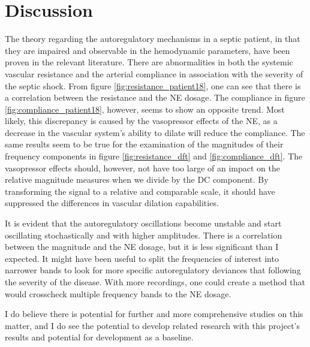 
\chapter{Discussion}

The theory regarding the autoregulatory mechanisms in a septic patient, in that they are impaired and observable in the hemodynamic parameters, have been proven in the relevant literature. There are abnormalities in both the systemic vascular resistance and the arterial compliance in association with the severity of the septic shock. From figure \ref{fig:resistance_patient18}, one can see that there is a correlation between the resistance and the NE dosage. The compliance in figure \ref{fig:compliance_patient18}, however, seems to show an opposite trend. Most likely, this discrepancy is caused by the vasopressor effects of the NE, as a decrease in the vascular system's ability to dilate will reduce the compliance. The same results seem to be true for the examination of the magnitudes of their frequency components in figure \ref{fig:resistance_dft} and \ref{fig:compliance_dft}. The vasopressor effects should, however, not have too large of an impact on the relative magnitude measures when we divide by the DC component. By transforming the signal to a relative and comparable scale, it should have suppressed the differences in vascular dilation capabilities.

It is evident that the autoregulatory oscillations become unstable and start oscillating stochastically and with higher amplitudes. There is a correlation between the magnitude and the NE dosage, but it is less significant than I expected. It might have been useful to split the frequencies of interest into narrower bands to look for more specific autoregulatory deviances that following the severity of the disease. With more recordings, one could create a method that would crosscheck multiple frequency bands to the NE dosage. 

I do believe there is potential for further and more comprehensive studies on this matter, and I do see the potential to develop related research with this project's results and potential for development as a baseline.



\cleardoublepage